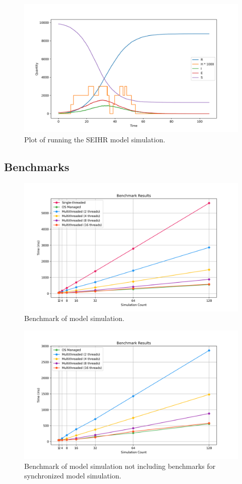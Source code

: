 \begin{figure}[H]
	\centering
	\includegraphics[width=\textwidth]{../plots/seihr.png}
	\caption{Plot of running the SEIHR model simulation.}
	\label{fig:plot_seihr}
\end{figure}

\subsection{Benchmarks}
\begin{figure}[H]
	\centering
	\includegraphics[width=\textwidth]{../benchmark/multithread_benchmark_with_sync.png}
	\caption{Benchmark of model simulation.}
	\label{fig:benchmark_multithread_with_sync}
\end{figure}

\begin{figure}[H]
	\centering
	\includegraphics[width=\textwidth]{../benchmark/multithread_benchmark_without_sync.png}
	\caption{Benchmark of model simulation not including benchmarks for synchronized model simulation.}
	\label{fig:benchmark_multithread_without_sync}
\end{figure}
